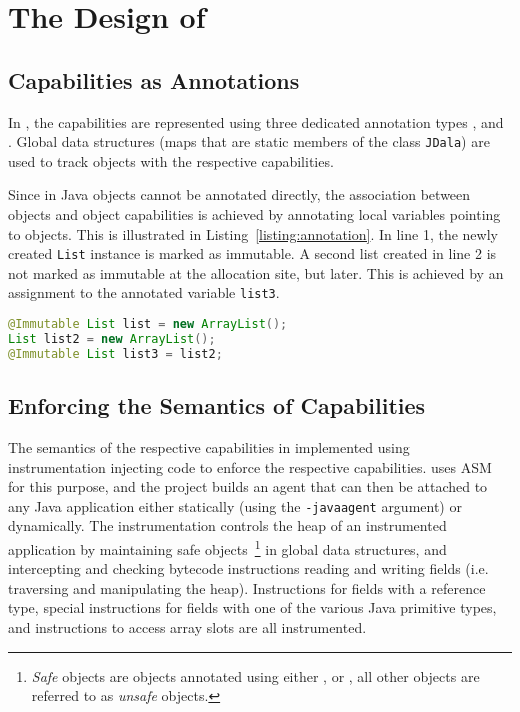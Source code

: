 \section{The Design of \jdala}
\label{sec:design}	


\subsection{Capabilities as Annotations}
\label{subsection:capabilitesAsAnnotations}

In \jdala, the \dala capabilities are represented using three dedicated annotation types \Immutable, \Isolated and \Local.  Global data structures (maps that are static members of the class \texttt{JDala}) are used to track objects with the respective capabilities.   

Since in Java  objects cannot be annotated directly, the association between objects and object capabilities is achieved by annotating local variables pointing to objects.  This is illustrated in Listing~\ref{listing:annotation}.  In line 1, the newly created \texttt{List} instance is marked as immutable.  A second list created in line 2 is not marked as immutable at the allocation site, but later. This is achieved by an assignment to the annotated variable \texttt{list3}. 


\begin{lstlisting}[language=Java, caption=Associating objects with capabilities, label=listing:annotation]
@Immutable List list = new ArrayList();
List list2 = new ArrayList();
@Immutable List list3 = list2;
\end{lstlisting}


\subsection{Enforcing the Semantics of Capabilities}

The semantics of the respective capabilities in implemented using instrumentation injecting code to enforce the respective capabilities. 
\jdala uses ASM~\cite{bruneton2002asm} for this purpose, and the project builds an agent that can then be attached to any Java application either statically (using the \texttt{-javaagent} argument) or dynamically.
The instrumentation controls the heap of an instrumented application by maintaining safe objects~\footnote{\textit{Safe} objects are objects annotated using either \Immutable, \Isolated or \Local, all other objects are referred to as \textit{unsafe} objects.} in global data structures, and intercepting and checking bytecode instructions reading and writing fields (i.e. traversing and manipulating the heap).  Instructions for fields with a reference type, special instructions for fields with one of the various Java primitive types, and instructions to access array slots are all instrumented. 

